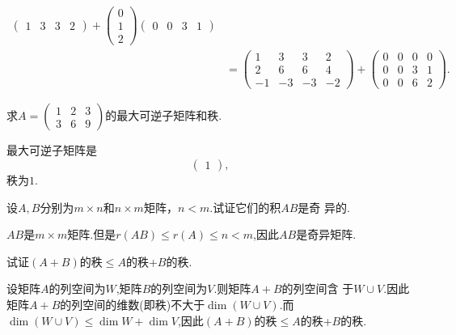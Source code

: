 ﻿\documentclass{book} \usepackage{exsheets} \usepackage{xeCJK}
\begin{document}
\begin{solution}
\begin{align*}
  \begin{pmatrix}
    1&3&3&2
  \end{pmatrix}+
           \begin{pmatrix}
             0\\
             1\\
             2
           \end{pmatrix}
  \begin{pmatrix}
    0&0&3&1
  \end{pmatrix}
  \\&=
      \begin{pmatrix}
        1&3&3&2\\
        2&6&6&4\\
        -1&-3&-3&-2
      \end{pmatrix}+
                  \begin{pmatrix}
                    0&0&0&0\\
                    0&0&3&1\\
                    0&0&6&2
                  \end{pmatrix}.
\end{align*}
\end{solution}
\begin{question}
  求$A=
  \begin{pmatrix}
    1&2&3\\
    3&6&9
  \end{pmatrix}
  $的最大可逆子矩阵和秩.
\end{question}
\begin{solution}
  最大可逆子矩阵是
$$
\begin{pmatrix}
  1
\end{pmatrix},
$$
秩为$1$.
\end{solution}
\begin{question}
  设$A,B$分别为$m\times n$和$n\times m$矩阵，$n<m$.试证它们的积$AB$是奇
  异的.
\end{question}
\begin{solution}
  $AB$是$m\times m$矩阵.但是$r(AB)\leq r(A)\leq n<m$,因此$AB$是奇异矩阵.
\end{solution}
\begin{question}
  试证$(A+B)$的秩$\leq A$的秩+$B$的秩.
\end{question}
\begin{solution}
  设矩阵$A$的列空间为$W$,矩阵$B$的列空间为$V$.则矩阵$A+B$的列空间含
  于$W\cup V$.因此矩阵$A+B$的列空间的维数(即秩)不大于$\dim (W\cup
  V)$.而$\dim (W\cup V)\leq \dim W+\dim V
  $,因此$(A+B)$的秩$\leq A$的秩+$B$的秩.
\end{solution}
\end{document}
